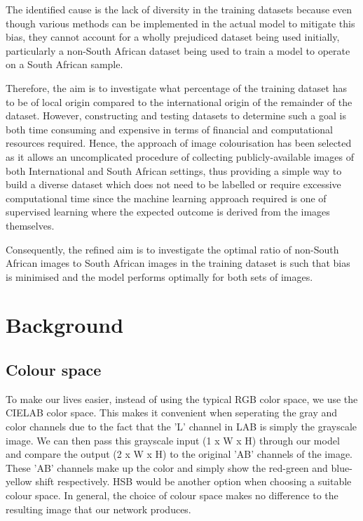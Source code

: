 \documentclass[conference]{IEEEtran}
\begin{document}
The identified cause is the lack of diversity in the training datasets because even though various methods can be implemented in the actual model to mitigate this bias, they cannot account for a wholly prejudiced dataset being used initially, particularly a non-South African dataset being used to train a model to operate on a South African sample. 

Therefore, the aim is to investigate what percentage of the training dataset has to be of local origin compared to the international origin of the remainder of the dataset. However, constructing and testing datasets to determine such a goal is both time consuming and expensive in terms of financial and computational resources required. Hence, the approach of image colourisation has been selected as it allows an uncomplicated procedure of collecting publicly-available images of both International and South African settings, thus providing a simple way to build a diverse dataset which does not need to be labelled or require excessive computational time since the machine learning approach required is one of supervised learning where the expected outcome is derived from the images themselves.

Consequently, the refined aim is to investigate the optimal ratio of non-South African images to South African images in the training dataset is such that bias is minimised and the model performs optimally for both sets of images.

\section{Background}




\subsection{Colour space}

To make our lives easier, instead of using the typical RGB color space, we use the CIELAB color space. This makes it convenient when seperating the gray and color channels due to the fact that the 'L' channel in LAB is simply the grayscale image. We can then pass this grayscale input (1 x W x H) through our model and compare the output (2 x W x H) to the original 'AB' channels of the image. These 'AB' channels make up the color and simply show the red-green and blue-yellow shift respectively. HSB would be another option when choosing a suitable colour space. In general, the choice of colour space makes no difference to the resulting image that our network produces.
\end{document}
